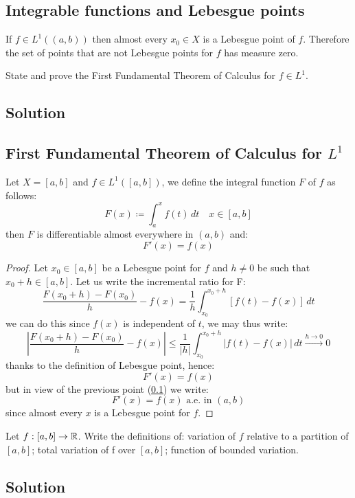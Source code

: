 \subsection{Integrable functions and Lebesgue points}\label{intfunc:lebpoi}
If $f\in L^1((a,b))$ then almost every $x_0 \in X$ is a Lebesgue point of $f$. Therefore the set of points that are not Lebesgue points for $f$ has measure zero.


\question
State and prove the First Fundamental Theorem of Calculus for $f \in L^1$.

\subsection*{Solution}

\subsection{First Fundamental Theorem of Calculus for \texorpdfstring{$L^1$}{L1}} \label{FTC:1}
Let $X=[a,b]$ and $f \in L^1([a,b])$, we define the integral function $F$ of $f$ as follows:
\[
    F(x) \coloneqq \int_a^x f(t) \, dt \quad x \in [a,b]
\]
then $F$ is differentiable almost everywhere in $(a,b)$ and:
\[
    F'(x) = f(x)    
\]

\begin{proof}
    Let $x_0 \in [a,b]$ be a Lebesgue point for $f$ and $h\neq 0$ be such that $x_0+h \in [a,b]$. Let us write the incremental ratio for F:
    \[
        \frac{F(x_0+h)-F(x_0)}{h} - f(x) = \frac{1}{h} \int_{x_0}^{x_0+h} [f(t) - f(x)] \, dt    
    \]
    we can do this since $f(x)$ is independent of $t$, we may thus write:
    \[
        \left| \frac{F(x_0+h)-F(x_0)}{h} - f(x) \right| \leq \frac{1}{|h|} \int_{x_0}^{x_0+h} |f(t) - f(x)| \, dt \xrightarrow{h\to0} 0
    \]
    thanks to the definition of Lebesgue point, hence:
    \[
        F'(x) = f(x)    
    \]
    but in view of the previous point (\ref{intfunc:lebpoi}) we write:
    \[
        F'(x) = f(x) \text{ a.e. in } (a,b)
    \]
    since almost every $x$ is a Lebesgue point for $f$.
\end{proof}



\question
Let $f : [a, b] \to \mathbb{R}$. Write the definitions of: variation of $f$ relative to a partition of $[a, b]$; total variation of f over $[a, b]$; function of bounded variation.

\subsection*{Solution}


